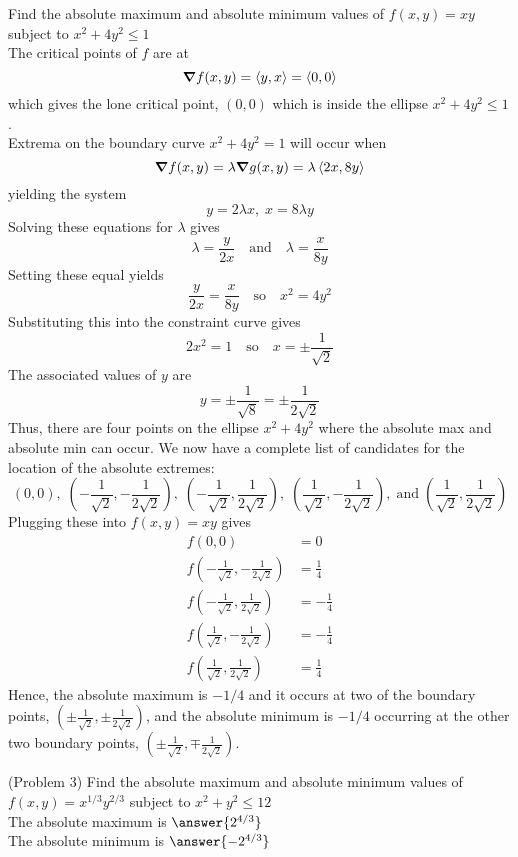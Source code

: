 \documentclass[handout]{ximera}
\begin{document}
\begin{example}[Example 3]
Find the absolute maximum and absolute minimum values of $f(x,y) = xy$ subject to $x^2 + 4y^2 \leq 1$\\
The critical points of $f$ are at
\[
\boldsymbol\nabla f(x,y) = \left\langle y, x\right\rangle = \left\langle 0,0\right\rangle
\]
 which gives the lone critical point, $(0,0)$ which is inside the ellipse $x^2 + 4y^2 \leq 1$.\\
 Extrema on the boundary curve $x^2 + 4y^2 = 1$ will occur when
 \[
 \boldsymbol\nabla f(x,y) = \lambda \boldsymbol\nabla g(x,y) = \lambda \left\langle 2x, 8y\right\rangle
 \]
 yielding the system
 \[
 y = 2\lambda x, \; x = 8\lambda y
 \]
 Solving these equations for $\lambda$ gives
 \[
 \lambda = \frac{y}{2x} \quad \text{and} \quad \lambda = \frac{x}{8y}
 \]
 Setting these equal yields
 \[
 \frac{y}{2x} = \frac{x}{8y} \quad \text{so} \quad x^2 = 4y^2
 \]
Substituting this into the constraint curve gives
\[
2x^2 = 1 \quad \text{so} \quad x = \pm \frac{1}{\sqrt 2}
\]
The associated values of $y$ are 
\[
y = \pm \frac{1}{\sqrt 8} = \pm \frac{1}{2\sqrt 2}
\]
Thus, there are four points on the ellipse $x^2 + 4y^2$ where the absolute max and absolute min can occur.
We now have a complete list of candidates for the location of the absolute extremes:
 \[
 (0,0), \; \left(-\frac{1}{\sqrt 2},-\frac{1}{2\sqrt 2} \right), \; \left(-\frac{1}{\sqrt 2},\frac{1}{2\sqrt 2} \right),
  \; \left(\frac{1}{\sqrt 2},-\frac{1}{2\sqrt 2} \right), \;\text{and} \; \left(\frac{1}{\sqrt 2},\frac{1}{2\sqrt 2} \right)
 \]
 Plugging these into $f(x,y) = xy$ gives
 \begin{align*}
 f(0,0) &= 0\\
 f\left(-\frac{1}{\sqrt 2},-\frac{1}{2\sqrt 2} \right) &= \frac14\\
 f\left(-\frac{1}{\sqrt 2},\frac{1}{2\sqrt 2} \right) &= -\frac14\\
 f\left(\frac{1}{\sqrt 2},-\frac{1}{2\sqrt 2} \right) &= -\frac14\\
 f\left(\frac{1}{\sqrt 2},\frac{1}{2\sqrt 2} \right) &= \frac14
 \end{align*}
 Hence, the absolute maximum is $-1/4$ and it occurs at two of the 
 boundary points, $\left(\pm \frac{1}{\sqrt 2}, \pm \frac{1}{2\sqrt 2}\right)$,
 and the absolute minimum is $-1/4$ occurring at the other two 
 boundary points, $\left(\pm \frac{1}{\sqrt 2}, \mp \frac{1}{2\sqrt 2}\right)$.
 
 
\end{example}

\begin{problem}(Problem 3)
Find the absolute maximum and absolute minimum values of $f(x,y) = x^{1/3}y^{2/3}$ subject to $x^2 + y^2 \leq 12$\\
The absolute maximum is $\answer{2^{4/3}}$\\
The absolute minimum is $\answer{-2^{4/3}}$
\end{problem}
\end{document}
